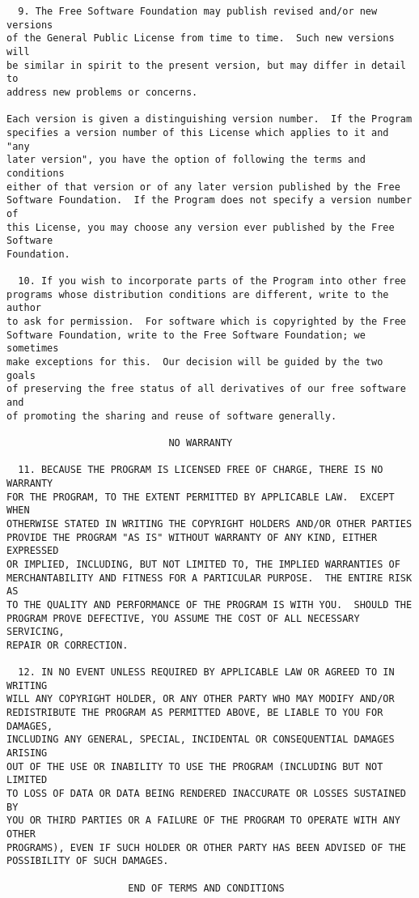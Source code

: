 \begin{verbatim}
  9. The Free Software Foundation may publish revised and/or new versions
of the General Public License from time to time.  Such new versions will
be similar in spirit to the present version, but may differ in detail to
address new problems or concerns.

Each version is given a distinguishing version number.  If the Program
specifies a version number of this License which applies to it and "any
later version", you have the option of following the terms and conditions
either of that version or of any later version published by the Free
Software Foundation.  If the Program does not specify a version number of
this License, you may choose any version ever published by the Free Software
Foundation.

  10. If you wish to incorporate parts of the Program into other free
programs whose distribution conditions are different, write to the author
to ask for permission.  For software which is copyrighted by the Free
Software Foundation, write to the Free Software Foundation; we sometimes
make exceptions for this.  Our decision will be guided by the two goals
of preserving the free status of all derivatives of our free software and
of promoting the sharing and reuse of software generally.

                            NO WARRANTY

  11. BECAUSE THE PROGRAM IS LICENSED FREE OF CHARGE, THERE IS NO WARRANTY
FOR THE PROGRAM, TO THE EXTENT PERMITTED BY APPLICABLE LAW.  EXCEPT WHEN
OTHERWISE STATED IN WRITING THE COPYRIGHT HOLDERS AND/OR OTHER PARTIES
PROVIDE THE PROGRAM "AS IS" WITHOUT WARRANTY OF ANY KIND, EITHER EXPRESSED
OR IMPLIED, INCLUDING, BUT NOT LIMITED TO, THE IMPLIED WARRANTIES OF
MERCHANTABILITY AND FITNESS FOR A PARTICULAR PURPOSE.  THE ENTIRE RISK AS
TO THE QUALITY AND PERFORMANCE OF THE PROGRAM IS WITH YOU.  SHOULD THE
PROGRAM PROVE DEFECTIVE, YOU ASSUME THE COST OF ALL NECESSARY SERVICING,
REPAIR OR CORRECTION.

  12. IN NO EVENT UNLESS REQUIRED BY APPLICABLE LAW OR AGREED TO IN WRITING
WILL ANY COPYRIGHT HOLDER, OR ANY OTHER PARTY WHO MAY MODIFY AND/OR
REDISTRIBUTE THE PROGRAM AS PERMITTED ABOVE, BE LIABLE TO YOU FOR DAMAGES,
INCLUDING ANY GENERAL, SPECIAL, INCIDENTAL OR CONSEQUENTIAL DAMAGES ARISING
OUT OF THE USE OR INABILITY TO USE THE PROGRAM (INCLUDING BUT NOT LIMITED
TO LOSS OF DATA OR DATA BEING RENDERED INACCURATE OR LOSSES SUSTAINED BY
YOU OR THIRD PARTIES OR A FAILURE OF THE PROGRAM TO OPERATE WITH ANY OTHER
PROGRAMS), EVEN IF SUCH HOLDER OR OTHER PARTY HAS BEEN ADVISED OF THE
POSSIBILITY OF SUCH DAMAGES.

                     END OF TERMS AND CONDITIONS
\end{verbatim}

